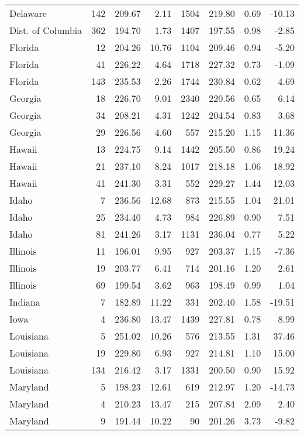 \begin{longtable}{lrrr@{\extracolsep{10pt}}rrrr}
  Delaware & 142 & 209.67 & 2.11 & 1504 & 219.80 & 0.69 & -10.13 \\ 
  Dist. of Columbia & 362 & 194.70 & 1.73 & 1407 & 197.55 & 0.98 & -2.85 \\ 
  Florida &  12 & 204.26 & 10.76 & 1104 & 209.46 & 0.94 & -5.20 \\ 
  Florida &  41 & 226.22 & 4.64 & 1718 & 227.32 & 0.73 & -1.09 \\ 
  Florida & 143 & 235.53 & 2.26 & 1744 & 230.84 & 0.62 & 4.69 \\ 
  Georgia &  18 & 226.70 & 9.01 & 2340 & 220.56 & 0.65 & 6.14 \\ 
  Georgia &  34 & 208.21 & 4.31 & 1242 & 204.54 & 0.83 & 3.68 \\ 
  Georgia &  29 & 226.56 & 4.60 & 557 & 215.20 & 1.15 & 11.36 \\ 
  Hawaii &  13 & 224.75 & 9.14 & 1442 & 205.50 & 0.86 & 19.24 \\ 
  Hawaii &  21 & 237.10 & 8.24 & 1017 & 218.18 & 1.06 & 18.92 \\ 
  Hawaii &  41 & 241.30 & 3.31 & 552 & 229.27 & 1.44 & 12.03 \\ 
  Idaho &   7 & 236.56 & 12.68 & 873 & 215.55 & 1.04 & 21.01 \\ 
  Idaho &  25 & 234.40 & 4.73 & 984 & 226.89 & 0.90 & 7.51 \\ 
  Idaho &  81 & 241.26 & 3.17 & 1131 & 236.04 & 0.77 & 5.22 \\ 
  Illinois &  11 & 196.01 & 9.95 & 927 & 203.37 & 1.15 & -7.36 \\ 
  Illinois &  19 & 203.77 & 6.41 & 714 & 201.16 & 1.20 & 2.61 \\ 
  Illinois &  69 & 199.54 & 3.62 & 963 & 198.49 & 0.99 & 1.04 \\ 
  Indiana &   7 & 182.89 & 11.22 & 331 & 202.40 & 1.58 & -19.51 \\ 
  Iowa &   4 & 236.80 & 13.47 & 1439 & 227.81 & 0.78 & 8.99 \\ 
  Louisiana &   5 & 251.02 & 10.26 & 576 & 213.55 & 1.31 & 37.46 \\ 
  Louisiana &  19 & 229.80 & 6.93 & 927 & 214.81 & 1.10 & 15.00 \\ 
  Louisiana & 134 & 216.42 & 3.17 & 1331 & 200.50 & 0.90 & 15.92 \\ 
  Maryland &   5 & 198.23 & 12.61 & 619 & 212.97 & 1.20 & -14.73 \\ 
  Maryland &   4 & 210.23 & 13.47 & 215 & 207.84 & 2.09 & 2.40 \\ 
  Maryland &   9 & 191.44 & 10.22 &  90 & 201.26 & 3.73 & -9.82 \\ 

\end{longtable}

